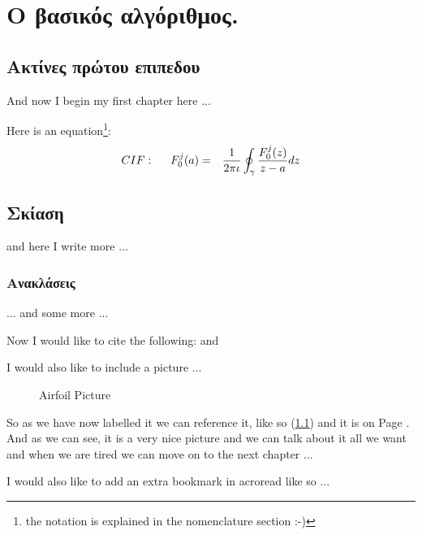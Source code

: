 \chapter{Ο βασικός αλγόριθμος.}

\ifpdf
    \graphicspath{{Chapter1/Chapter1Figs/PNG/}{Chapter1/Chapter1Figs/PDF/}{Chapter1/Chapter1Figs/}}
\else
    \graphicspath{{Chapter1/Chapter1Figs/EPS/}{Chapter1/Chapter1Figs/}}
\fi

\section{Ακτίνες πρώτου επιπεδου}

And now I begin my first chapter here ...

Here is an equation\footnote{the notation is explained in the nomenclature section :-)}:
\begin{eqnarray}
CIF: \hspace*{5mm}F_0^j(a) &=& \frac{1}{2\pi \iota} \oint_{\gamma} \frac{F_0^j(z)}{z - a} dz
\end{eqnarray}

\section{Σκίαση}
and here I write more ...\cite{texbook}

\subsection{Aνακλάσεις}
... and some more ...

Now I would like to cite the following: \cite{latex} and \cite{texbook}

I would also like to include a picture ...

\begin{figure}[!htbp]
  \begin{center}
    \leavevmode
    \ifpdf
    \else
    \fi
    \caption{Airfoil Picture}
    \label{FigAir}
  \end{center}
\end{figure}


So as we have now labelled it we can reference it, like so (\ref{FigAir}) and it
is on Page \pageref{FigAir}. And as we can see, it is a very nice picture and we
can talk about it all we want and when we are tired we can move on to the next
chapter ...

I would also like to add an extra bookmark in acroread like so ...
\ifpdf
\fi



